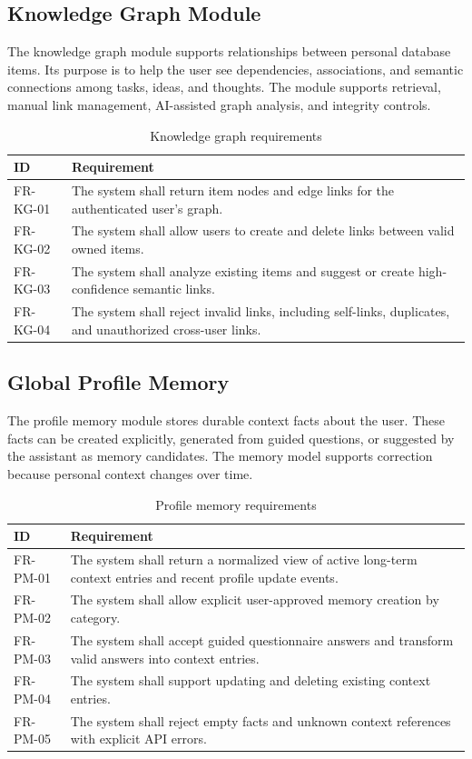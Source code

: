 \subsection{Knowledge Graph Module}

The knowledge graph module supports relationships between personal database items. Its purpose is to help the user see dependencies, associations, and semantic connections among tasks, ideas, and thoughts. The module supports retrieval, manual link management, AI-assisted graph analysis, and integrity controls.

\begin{longtable}{|p{}|p{}|}
\caption{Knowledge graph requirements}
\label{tab:graph-req}\\
\hline
\textbf{ID} & \textbf{Requirement}\\
\hline
FR-KG-01 & The system shall return item nodes and edge links for the authenticated user's graph.\\
\hline
FR-KG-02 & The system shall allow users to create and delete links between valid owned items.\\
\hline
FR-KG-03 & The system shall analyze existing items and suggest or create high-confidence semantic links.\\
\hline
FR-KG-04 & The system shall reject invalid links, including self-links, duplicates, and unauthorized cross-user links.\\
\hline
\end{longtable}

\subsection{Global Profile Memory}

The profile memory module stores durable context facts about the user. These facts can be created explicitly, generated from guided questions, or suggested by the assistant as memory candidates. The memory model supports correction because personal context changes over time.

\begin{longtable}{|p{}|p{}|}
\caption{Profile memory requirements}
\label{tab:memory-req}\\
\hline
\textbf{ID} & \textbf{Requirement}\\
\hline
FR-PM-01 & The system shall return a normalized view of active long-term context entries and recent profile update events.\\
\hline
FR-PM-02 & The system shall allow explicit user-approved memory creation by category.\\
\hline
FR-PM-03 & The system shall accept guided questionnaire answers and transform valid answers into context entries.\\
\hline
FR-PM-04 & The system shall support updating and deleting existing context entries.\\
\hline
FR-PM-05 & The system shall reject empty facts and unknown context references with explicit API errors.\\
\hline
\end{longtable}


